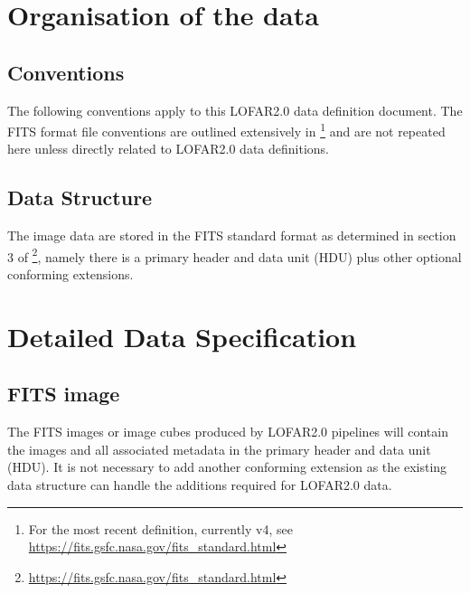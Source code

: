 \documentclass[a4paper,10pt,bibtotoc]{scrartcl}
\begin{document}
\newpage
\section{Organisation of the data}
\label{sec:structure}

\subsection{Conventions}
The following conventions apply to this LOFAR2.0 data definition document. The FITS format file conventions are outlined extensively in \cite{FITSv3.0}\footnote{For the most recent definition, currently v4, see \url{https://fits.gsfc.nasa.gov/fits_standard.html}} and are not repeated here unless directly related to LOFAR2.0 data definitions.





\subsection{Data Structure}

The image data are stored in the FITS standard format as determined in section 3 of  \cite{FITSv3.0}\footnote{\url{https://fits.gsfc.nasa.gov/fits_standard.html}}, namely there is a primary header and data unit (HDU) plus other optional conforming extensions.



\newpage
\section{Detailed Data Specification}

\subsection{FITS image}

The FITS images or image cubes produced by LOFAR2.0 pipelines will contain the images and all associated metadata in the primary header and data unit (HDU). It is not necessary to add another conforming extension as the existing data structure can handle the additions required for LOFAR2.0 data.
\end{document}

